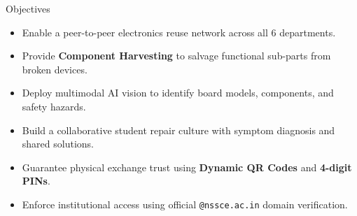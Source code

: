 \documentclass{beamer}
\begin{document}
\begin{frame}{Objectives}

\begin{itemize}
    \setlength\itemsep{0.3cm}
    \item Enable a peer-to-peer electronics reuse network across all 6 departments.

    \item Provide \textbf{Component Harvesting} to salvage functional sub-parts from broken devices.

    \item Deploy multimodal AI vision to identify board models, components, and safety hazards.

    \item Build a collaborative student repair culture with symptom diagnosis and shared solutions.

    \item Guarantee physical exchange trust using \textbf{Dynamic QR Codes} and \textbf{4-digit PINs}.

    \item Enforce institutional access using official \texttt{@nssce.ac.in} domain verification.
\end{itemize}

\end{frame}

\end{document}
